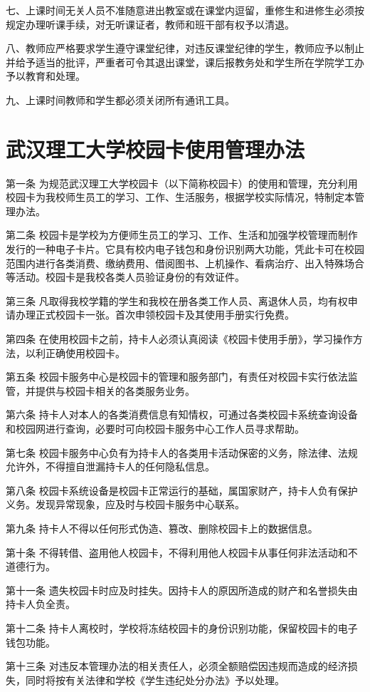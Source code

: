 \documentclass[UTF8,12pt,a4paper]{report}
\begin{document}
七、上课时间无关人员不准随意进出教室或在课堂内逗留，重修生和进修生必须按规定办理听课手续，对无听课证者，教师和班干部有权予以清退。

八、教师应严格要求学生遵守课堂纪律，对违反课堂纪律的学生，教师应予以制止并给予适当的批评，严重者可令其退出课堂，课后报教务处和学生所在学院学工办予以教育和处理。

九、上课时间教师和学生都必须关闭所有通讯工具。

\chapter{武汉理工大学校园卡使用管理办法}
第一条 为规范武汉理工大学校园卡（以下简称校园卡）的使用和管理，充分利用校园卡为我校师生员工的学习、工作、生活服务，根据学校实际情况，特制定本管理办法。

第二条 校园卡是学校为方便师生员工的学习、工作、生活和加强学校管理而制作发行的一种电子卡片。它具有校内电子钱包和身份识别两大功能，凭此卡可在校园范围内进行各类消费、缴纳费用、借阅图书、上机操作、看病治疗、出入特殊场合等活动。校园卡是我校各类人员验证身份的有效证件。

第三条 凡取得我校学籍的学生和我校在册各类工作人员、离退休人员，均有权申请办理正式校园卡一张。首次申领校园卡及其使用手册实行免费。

第四条 在使用校园卡之前，持卡人必须认真阅读《校园卡使用手册》，学习操作方法，以利正确使用校园卡。

第五条 校园卡服务中心是校园卡的管理和服务部门，有责任对校园卡实行依法监管，并提供与校园卡相关的各类服务业务。

第六条 持卡人对本人的各类消费信息有知情权，可通过各类校园卡系统查询设备和校园网进行查询，必要时可向校园卡服务中心工作人员寻求帮助。

第七条 校园卡服务中心负有为持卡人的各类用卡活动保密的义务，除法律、法规允许外，不得擅自泄漏持卡人的任何隐私信息。

第八条 校园卡系统设备是校园卡正常运行的基础，属国家财产，持卡人负有保护义务。发现异常现象，应及时与校园卡服务中心联系。

第九条 持卡人不得以任何形式伪造、篡改、删除校园卡上的数据信息。

第十条 不得转借、盗用他人校园卡，不得利用他人校园卡从事任何非法活动和不道德行为。

第十一条 遗失校园卡时应及时挂失。因持卡人的原因所造成的财产和名誉损失由持卡人负全责。

第十二条 持卡人离校时，学校将冻结校园卡的身份识别功能，保留校园卡的电子钱包功能。

第十三条 对违反本管理办法的相关责任人，必须全额赔偿因违规而造成的经济损失，同时将按有关法律和学校《学生违纪处分办法》予以处理。
\end{document}
